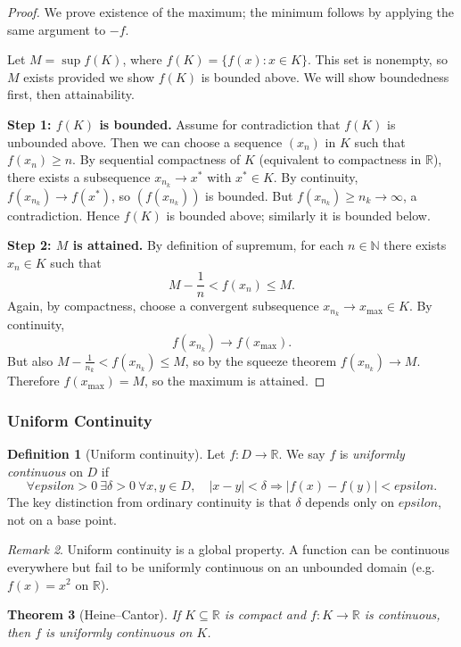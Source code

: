 \documentclass[12pt]{article}
\numberwithin{equation}{section}
\def\abs#1{|#1|}
\def\eps{epsilon}
\newcommand{\RR}{\mathbb{R}}
\newcommand{\NN}{\mathbb{N}}
\DeclarePairedDelimiter{\abs}{\lvert}{\rvert}
\newcommand{\eps}{\varepsilon}               %
\theoremstyle{plain}
\newtheorem{theorem}{Theorem}[section]
\theoremstyle{definition}
\newtheorem{definition}[theorem]{Definition}
\theoremstyle{remark}
\newtheorem{remark}[theorem]{Remark}
\begin{document}
\begin{proof}
We prove existence of the maximum; the minimum follows by applying the same argument to $-f$.

Let $M=\sup f(K)$, where $f(K)=\{f(x):x\in K\}$.
This set is nonempty, so $M$ exists provided we show $f(K)$ is bounded above.
We will show boundedness first, then attainability.

\medskip
\noindent\textbf{Step 1: $f(K)$ is bounded.}
Assume for contradiction that $f(K)$ is unbounded above.
Then we can choose a sequence $(x_n)$ in $K$ such that $f(x_n)\ge n$.
By sequential compactness of $K$ (equivalent to compactness in $\RR$), there exists a subsequence $x_{n_k}\to x^\ast$ with $x^\ast\in K$.
By continuity, $f(x_{n_k})\to f(x^\ast)$, so $(f(x_{n_k}))$ is bounded.
But $f(x_{n_k})\ge n_k\to\infty$, a contradiction.
Hence $f(K)$ is bounded above; similarly it is bounded below.

\medskip
\noindent\textbf{Step 2: $M$ is attained.}
By definition of supremum, for each $n\in\NN$ there exists $x_n\in K$ such that
\[
M-\frac{1}{n} < f(x_n) \le M.
\]
Again, by compactness, choose a convergent subsequence $x_{n_k}\to x_{\max}\in K$.
By continuity,
\[
f(x_{n_k}) \to f(x_{\max}).
\]
But also $M-\frac{1}{n_k} < f(x_{n_k}) \le M$, so by the squeeze theorem $f(x_{n_k})\to M$.
Therefore $f(x_{\max})=M$, so the maximum is attained.
\end{proof}

\subsubsection{Uniform Continuity}

\begin{definition}[Uniform continuity]\label{def:uniform-cont}
Let $f:D\to\RR$. We say $f$ is \emph{uniformly continuous} on $D$ if
\[
\forall \eps>0\ \exists \delta>0\ \forall x,y\in D,\quad \abs{x-y}<\delta \Rightarrow \abs{f(x)-f(y)}<\eps.
\]
The key distinction from ordinary continuity is that $\delta$ depends only on $\eps$, not on a base point.
\end{definition}

\begin{remark}
Uniform continuity is a global property.
A function can be continuous everywhere but fail to be uniformly continuous on an unbounded domain
(e.g.\ $f(x)=x^2$ on $\RR$).
\end{remark}

\begin{theorem}[Heine--Cantor]\label{thm:heine-cantor}
If $K\subseteq\RR$ is compact and $f:K\to\RR$ is continuous, then $f$ is uniformly continuous on $K$.
\end{theorem}
\end{document}
